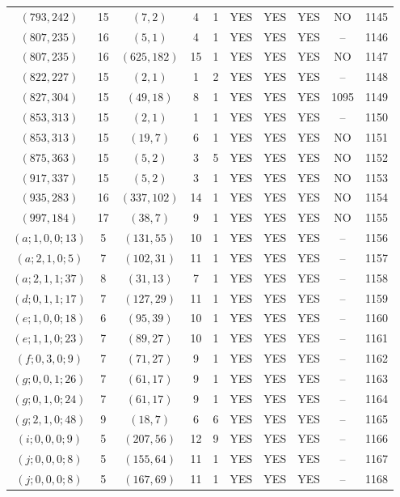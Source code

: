 \begin{longtable}{|c|c|c|c|c|c|c|c|c|c|}
$(793, 242)$ & 15 & $(7, 2)$ & 4 & 1 & YES & YES & YES & NO & 1145\\
$(807, 235)$ & 16 & $(5, 1)$ & 4 & 1 & YES & YES & YES & -- & 1146\\
$(807, 235)$ & 16 & $(625, 182)$ & 15 & 1 & YES & YES & YES & NO & 1147\\
$(822, 227)$ & 15 & $(2, 1)$ & 1 & 2 & YES & YES & YES & -- & 1148\\
$(827, 304)$ & 15 & $(49, 18)$ & 8 & 1 & YES & YES & YES & 1095 & 1149\\
$(853, 313)$ & 15 & $(2, 1)$ & 1 & 1 & YES & YES & YES & -- & 1150\\
$(853, 313)$ & 15 & $(19, 7)$ & 6 & 1 & YES & YES & YES & NO & 1151\\
$(875, 363)$ & 15 & $(5, 2)$ & 3 & 5 & YES & YES & YES & NO & 1152\\
$(917, 337)$ & 15 & $(5, 2)$ & 3 & 1 & YES & YES & YES & NO & 1153\\
$(935, 283)$ & 16 & $(337, 102)$ & 14 & 1 & YES & YES & YES & NO & 1154\\
$(997, 184)$ & 17 & $(38, 7)$ & 9 & 1 & YES & YES & YES & NO & 1155\\
$(a; 1, 0, 0; 13)$ & 5 & $(131, 55)$ & 10 & 1 & YES & YES & YES & -- & 1156\\
$(a; 2, 1, 0; 5)$ & 7 & $(102, 31)$ & 11 & 1 & YES & YES & YES & -- & 1157\\
$(a; 2, 1, 1; 37)$ & 8 & $(31, 13)$ & 7 & 1 & YES & YES & YES & -- & 1158\\
$(d; 0, 1, 1; 17)$ & 7 & $(127, 29)$ & 11 & 1 & YES & YES & YES & -- & 1159\\
$(e; 1, 0, 0; 18)$ & 6 & $(95, 39)$ & 10 & 1 & YES & YES & YES & -- & 1160\\
$(e; 1, 1, 0; 23)$ & 7 & $(89, 27)$ & 10 & 1 & YES & YES & YES & -- & 1161\\
$(f; 0, 3, 0; 9)$ & 7 & $(71, 27)$ & 9 & 1 & YES & YES & YES & -- & 1162\\
$(g; 0, 0, 1; 26)$ & 7 & $(61, 17)$ & 9 & 1 & YES & YES & YES & -- & 1163\\
$(g; 0, 1, 0; 24)$ & 7 & $(61, 17)$ & 9 & 1 & YES & YES & YES & -- & 1164\\
$(g; 2, 1, 0; 48)$ & 9 & $(18, 7)$ & 6 & 6 & YES & YES & YES & -- & 1165\\
$(i; 0, 0, 0; 9)$ & 5 & $(207, 56)$ & 12 & 9 & YES & YES & YES & -- & 1166\\
$(j; 0, 0, 0; 8)$ & 5 & $(155, 64)$ & 11 & 1 & YES & YES & YES & -- & 1167\\
$(j; 0, 0, 0; 8)$ & 5 & $(167, 69)$ & 11 & 1 & YES & YES & YES & -- & 1168
\end{longtable}
